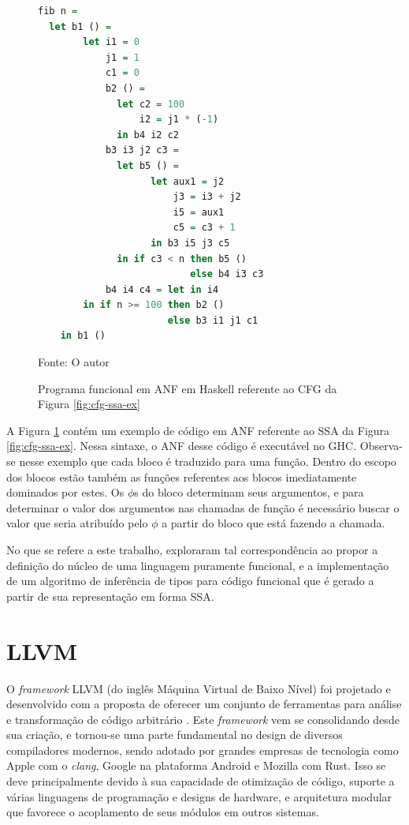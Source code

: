 \begin{figure}[h]
    \centering
\lstset{%
    xleftmargin=.17\textwidth,
}    
\begin{lstlisting}[language=Haskell,style=nasm]
fib n =
  let b1 () =
        let i1 = 0
            j1 = 1
            c1 = 0
            b2 () =
              let c2 = 100
                  i2 = j1 * (-1)
              in b4 i2 c2
            b3 i3 j2 c3 =
              let b5 () =
                    let aux1 = j2
                        j3 = i3 + j2
                        i5 = aux1
                        c5 = c3 + 1
                    in b3 i5 j3 c5
              in if c3 < n then b5 ()
                           else b4 i3 c3
            b4 i4 c4 = let in i4
        in if n >= 100 then b2 ()
                       else b3 i1 j1 c1          
    in b1 ()
\end{lstlisting}    
    \caption{Programa funcional em ANF em Haskell referente ao CFG da Figura \ref{fig:cfg-ssa-ex}}
    \label{fig:eq-ssa-func}
    \small{Fonte: O autor}
\end{figure}

A Figura \ref{fig:eq-ssa-func} contém um exemplo de código em ANF referente ao SSA da Figura \ref{fig:cfg-ssa-ex}. Nessa sintaxe, o ANF desse código é executável no GHC. Observa-se nesse exemplo que cada bloco é traduzido para uma função. Dentro do escopo dos blocos estão também as funções referentes aos blocos imediatamente dominados por estes. Os $\phi$s do bloco determinam seus argumentos, e para determinar o valor dos argumentos nas chamadas de função é necessário buscar o valor que seria atribuído pelo $\phi$ a partir do bloco que está fazendo a chamada.

No que se refere a este trabalho,  exploraram tal correspondência ao propor a definição do núcleo de uma linguagem puramente funcional, e a implementação de um algoritmo de inferência de tipos para código funcional que é gerado a partir de sua representação em forma SSA.

\section{LLVM}

O \emph{framework} LLVM (do inglês Máquina Virtual de Baixo Nível) foi projetado e desenvolvido com a proposta de oferecer um conjunto de ferramentas para análise e transformação de código arbitrário \cite{lattner2004llvm}. Este \emph{framework} vem se consolidando desde sua criação, e tornou-se uma parte fundamental no design de diversos compiladores modernos, sendo adotado por grandes empresas de tecnologia como Apple com o \emph{clang}, Google na plataforma Android e Mozilla com Rust. Isso se deve principalmente devido à sua capacidade de otimização de código, suporte a várias linguagens de programação e designs de hardware, e arquitetura modular que favorece o acoplamento de seus módulos em outros sistemas.

